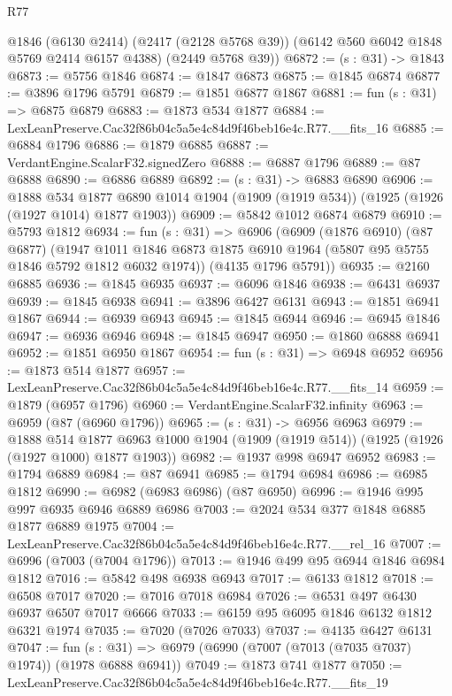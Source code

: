 \begin{lexlean}{R77}
\begin{coremodule}
      @1846
      (@6130 @2414)
      (@2417 (@2128 @5768 @39))
      (@6142 @560 @6042 @1848 @5769 @2414 @6157 @4388)
      (@2449 @5768 @39))
@6872 := (s : @31) -> @1843
@6873 := @5756 @1846
@6874 := @1847 @6873
@6875 := @1845 @6874
@6877 := @3896 @1796 @5791
@6879 := @1851 @6877 @1867
@6881 := fun (s : @31) => @6875 @6879
@6883 := @1873 @534 @1877
@6884 := LexLeanPreserve.Cac32f86b04c5a5e4c84d9f46beb16e4c.R77.__fits_16
@6885 := @6884 @1796
@6886 := @1879 @6885
@6887 := VerdantEngine.ScalarF32.signedZero
@6888 := @6887 @1796
@6889 := @87 @6888
@6890 := @6886 @6889
@6892 := (s : @31) -> @6883 @6890
@6906 := @1888
    @534
    @1877
    @6890
    @1014
    @1904
    (@1909 (@1919 @534))
    (@1925 (@1926 (@1927 @1014) @1877 @1903))
@6909 := @5842 @1012 @6874 @6879
@6910 := @5793 @1812
@6934 := fun (s : @31) =>
  @6906
    (@6909
      (@1876 @6910)
      (@87 @6877)
      (@1947 @1011 @1846 @6873 @1875 @6910 @1964 (@5807 @95 @5755 @1846 @5792 @1812 @6032 @1974))
      (@4135 @1796 @5791))
@6935 := @2160 @6885
@6936 := @1845 @6935
@6937 := @6096 @1846
@6938 := @6431 @6937
@6939 := @1845 @6938
@6941 := @3896 @6427 @6131
@6943 := @1851 @6941 @1867
@6944 := @6939 @6943
@6945 := @1845 @6944
@6946 := @6945 @1846
@6947 := @6936 @6946
@6948 := @1845 @6947
@6950 := @1860 @6888 @6941
@6952 := @1851 @6950 @1867
@6954 := fun (s : @31) => @6948 @6952
@6956 := @1873 @514 @1877
@6957 := LexLeanPreserve.Cac32f86b04c5a5e4c84d9f46beb16e4c.R77.__fits_14
@6959 := @1879 (@6957 @1796)
@6960 := VerdantEngine.ScalarF32.infinity
@6963 := @6959 (@87 (@6960 @1796))
@6965 := (s : @31) -> @6956 @6963
@6979 := @1888
    @514
    @1877
    @6963
    @1000
    @1904
    (@1909 (@1919 @514))
    (@1925 (@1926 (@1927 @1000) @1877 @1903))
@6982 := @1937 @998 @6947 @6952
@6983 := @1794 @6889
@6984 := @87 @6941
@6985 := @1794 @6984
@6986 := @6985 @1812
@6990 := @6982 (@6983 @6986) (@87 @6950)
@6996 := @1946 @995 @997 @6935 @6946 @6889 @6986
@7003 := @2024 @534 @377 @1848 @6885 @1877 @6889 @1975
@7004 := LexLeanPreserve.Cac32f86b04c5a5e4c84d9f46beb16e4c.R77.__rel_16
@7007 := @6996 (@7003 (@7004 @1796))
@7013 := @1946 @499 @95 @6944 @1846 @6984 @1812
@7016 := @5842 @498 @6938 @6943
@7017 := @6133 @1812
@7018 := @6508 @7017
@7020 := @7016 @7018 @6984
@7026 := @6531 @497 @6430 @6937 @6507 @7017 @6666
@7033 := @6159 @95 @6095 @1846 @6132 @1812 @6321 @1974
@7035 := @7020 (@7026 @7033)
@7037 := @4135 @6427 @6131
@7047 := fun (s : @31) => @6979 (@6990 (@7007 (@7013 (@7035 @7037) @1974)) (@1978 @6888 @6941))
@7049 := @1873 @741 @1877
@7050 := LexLeanPreserve.Cac32f86b04c5a5e4c84d9f46beb16e4c.R77.__fits_19

\end{coremodule}
\end{lexlean}
